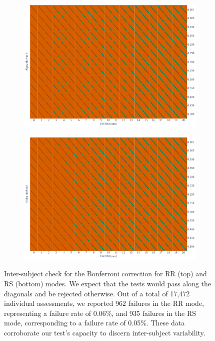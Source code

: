 \documentclass[lettersize,journal]{IEEEtran}
\begin{document}
\begin{figure}
    \centering
    \begin{subfigure}[t]{0.7\linewidth}
        \includegraphics[width=\linewidth]{figures/inter-subject/one_mct_fwe_bonferroni_RR.pdf}
    \end{subfigure}
    \begin{subfigure}[t]{0.7\linewidth}
        \includegraphics[width=\linewidth]{figures/inter-subject/one_mct_fwe_bonferroni_RS.pdf}
    \end{subfigure}
    \caption{Inter-subject check for the Bonferroni correction for RR (top) and RS (bottom) modes. We expect that the tests would pass along the diagonals and be rejected otherwise.
        Out of a total of 17,472 individual assessments, we reported 962 failures in the RR mode, representing a failure rate of 0.06\%, and 935 failures in the RS mode, corresponding to a failure rate of 0.05\%. These data corroborate our test's capacity to discern inter-subject variability.
    }
    \label{fig:ieee-check}
\end{figure}
\end{document}
